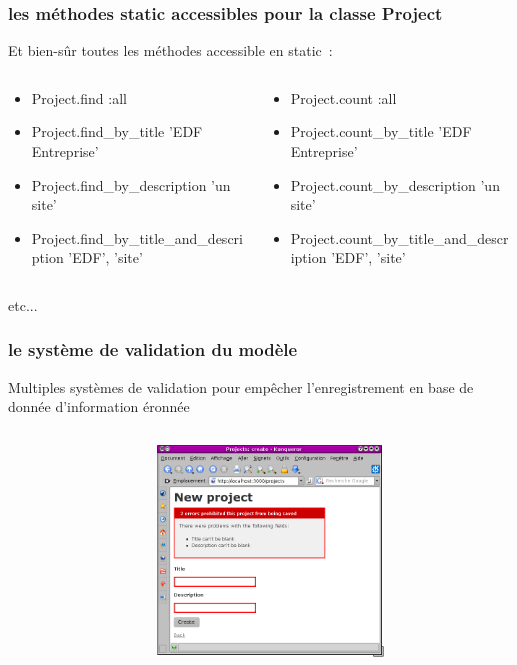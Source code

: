 \documentclass{beamer}
\begin{document}
\begin{frame}
    \frametitle{les méthodes static accessibles pour la classe Project}
    Et bien-sûr toutes les méthodes accessible en static~:
    \tiny{}
    \begin{columns}
        \begin{column}[l]{5cm}
            \begin{itemize}
                \item Project.find :all
                \item Project.find\_by\_title 'EDF Entreprise'
                \item Project.find\_by\_description 'un site'
                \item Project.find\_by\_title\_and\_description 'EDF', 'site'
            \end{itemize}
        \end{column}

        \begin{column}[r]{6cm}
            \begin{itemize}
                \item Project.count :all
                \item Project.count\_by\_title 'EDF Entreprise'
                \item Project.count\_by\_description 'un site'
                \item Project.count\_by\_title\_and\_description 'EDF', 'site'
            \end{itemize}
        \end{column}
    \end{columns}
    \normalsize{}
    etc...
\end{frame}

\begin{frame}
    \frametitle{le système de validation du modèle}
    Multiples systèmes de validation pour empêcher l'enregistrement en base de
    donnée d'information éronnée
    \scriptsize{}
    \begin{columns}
        \begin{column}[l]{5cm}
            
        \end{column}

        \begin{column}[r]{5cm}
            \includegraphics[width=60mm]{error_screenshot.png}
        \end{column}
    \end{columns}
\end{frame}
\end{document}
